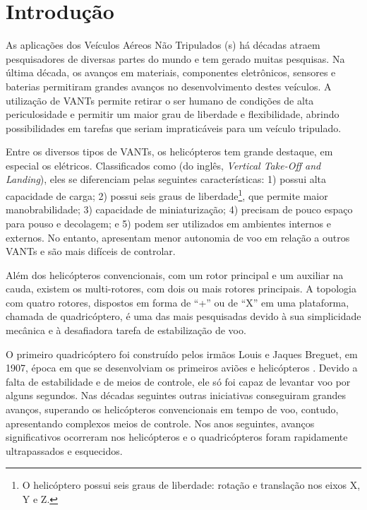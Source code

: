 \chapter{Introdução}\label{ch:intro}

As aplicações dos Veículos Aéreos Não Tripulados (s) há décadas atraem pesquisadores de diversas partes do mundo e tem gerado muitas pesquisas. Na última década, os avanços em materiais, componentes eletrônicos, sensores e baterias permitiram grandes avanços no desenvolvimento destes veículos. A utilização de VANTs permite retirar o ser humano de condições de alta periculosidade e permitir um maior grau de liberdade e flexibilidade, abrindo possibilidades em tarefas que seriam impraticáveis para um veículo tripulado.

Entre os diversos tipos de VANTs, os helicópteros tem grande destaque, em especial os elétricos. Classificados como  (do inglês, \textit{Vertical Take-Off and Landing}), eles se diferenciam pelas seguintes características: 1) possui alta capacidade de carga; 2) possui seis graus de liberdade\footnote{O helicóptero possui seis graus de liberdade: rotação e translação nos eixos X, Y e Z.}, que permite maior manobrabilidade; 3) capacidade de miniaturização; 4) precisam de pouco espaço para pouso e decolagem; e 5) podem ser utilizados em ambientes internos e externos. No entanto, apresentam menor autonomia de voo em relação a outros VANTs e são mais difíceis de controlar.

Além dos helicópteros convencionais, com um rotor principal e um auxiliar na cauda, existem os multi-rotores, com dois ou mais rotores principais. A topologia com quatro rotores, dispostos em forma de ``+'' ou de ``X'' em uma plataforma, chamada de quadricóptero, é uma das mais pesquisadas devido à sua simplicidade mecânica e à desafiadora tarefa de estabilização de voo.

O primeiro quadricóptero foi construído pelos irmãos Louis e Jaques Breguet, em 1907, época em que se desenvolviam os primeiros aviões e helicópteros \cite{leishman00}. Devido a falta de estabilidade e de meios de controle, ele só foi capaz de levantar voo por alguns segundos. Nas décadas seguintes outras iniciativas conseguiram grandes avanços, superando os helicópteros convencionais em tempo de voo, contudo, apresentando complexos meios de controle. Nos anos seguintes, avanços significativos ocorreram nos helicópteros e o quadricópteros foram rapidamente ultrapassados e esquecidos.

